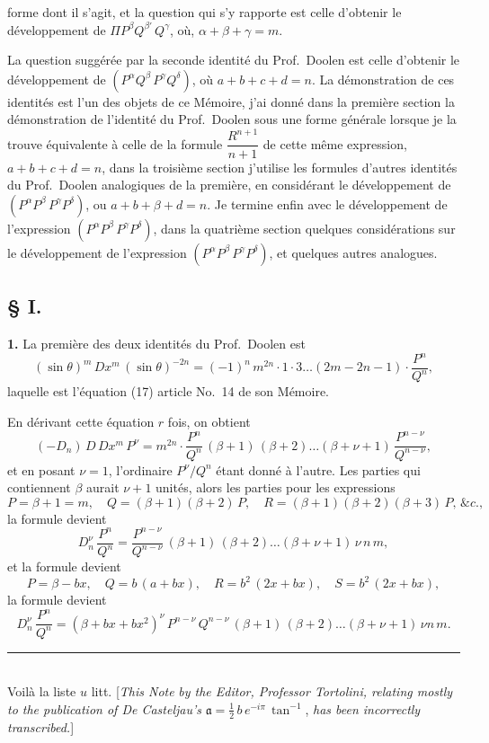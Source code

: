 \documentclass[11pt,a4paper]{article}
\begin{document}
forme dont il s'agit, et la question qui s'y rapporte est celle d'obtenir le développement de $\Pi P^\beta Q^{\beta'}\,Q^\gamma$, où, $\alpha + \beta + \gamma = m$.

La question suggérée par la seconde identité du Prof.~Doolen est celle d'obtenir le développement de $(P^\alpha Q^\beta\,P^\gamma Q^\delta)$, où $a + b + c + d = n$. La démonstration de ces identités est l'un des objets de ce Mémoire, j'ai donné dans la première section la démonstration de l'identité du Prof.~Doolen sous une forme générale lorsque je la trouve équivalente à celle de la formule $\dfrac{R^{n+1}}{n+1}$ de cette même expression, $a + b + c + d = n$, dans la troisième section j'utilise les formules d'autres identités du Prof.~Doolen analogiques de la première, en considérant le développement de $(P^\alpha P^\beta\,P^\gamma P^\delta)$, ou $a + b + \beta + d = n$. Je termine enfin avec le développement de l'expression $(P^\alpha P^\beta\,P^\gamma P^\delta)$, dans la quatrième section quelques considérations sur le développement de l'expression $(P^\alpha P^\beta\,P^\gamma P^\delta)$, et quelques autres analogues.

\subsection*{§ I.}

\textbf{1.} La première des deux identités du Prof.~Doolen est
\[
(\sin\theta)^{m}\,Dx^m\,(\sin\theta)^{-2n} = (-1)^n\, m^{2n}\cdot 1\cdot 3 \ldots (2m-2n-1)\cdot\frac{P^n}{Q^n},
\]
laquelle est l'équation (17) article No.~14 de son Mémoire.

En dérivant cette équation $r$ fois, on obtient
\[
(-D_n)\,D\,Dx^m\,P^\nu = m^{2n}\cdot\frac{P^n}{Q^n}\,(\beta+1)\,(\beta+2)\ldots(\beta+\nu+1)\, \frac{P^{n-\nu}}{Q^{n-\nu}},
\]
et en posant $\nu = 1$, l'ordinaire $P^\nu/Q^n$ étant donné à l'autre. Les parties qui contiennent $\beta$ aurait $\nu+1$ unités, alors les parties pour les expressions
\[
P = \beta+1 = m,\quad Q = (\beta+1)(\beta+2)\,P,\quad R = (\beta+1)(\beta+2)(\beta+3)\,P,\, \&c.,
\]
la formule devient
\[
D_n^\nu \,\frac{P^n}{Q^n} = \frac{P^{n-\nu}}{Q^{n-\nu}}\,(\beta+1)\,(\beta+2)\ldots(\beta+\nu+1)\,\nu\,n\,m,
\]
et la formule devient
\[
P = \beta - bx,\quad Q = b\,(a + bx),\quad R = b^2\,(2x+bx),\quad S = b^2\,(2x+bx),
\]
la formule devient
\[
D_n^\nu \,\frac{P^n}{Q^n} = (\beta + bx + bx^2)^\nu \,P^{n-\nu}\,Q^{n-\nu}\,(\beta+1)\,(\beta+2)\ldots(\beta+\nu+1)\,\nu n\,m.
\]

\noindent\rule{0.3\textwidth}{0.4pt}\\
\footnotesize Voilà la liste $u$ litt. [\textit{This Note} \textit{by the Editor, Professor Tortolini, relating mostly to the publication of De Casteljau's} $\mathfrak{a} = \tfrac{1}{2} \, b\, e^{-i\pi} \, \tan^{-1}$, \textit{has been incorrectly transcribed.}]
\end{document}
